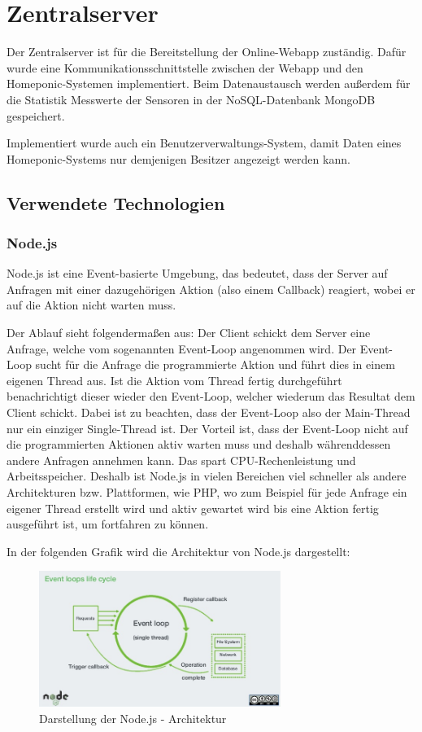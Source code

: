 \newpage
\blankpage
\section{Zentralserver}
\setcounter{page}{127}
Der Zentralserver ist für die Bereitstellung der Online-Webapp zuständig. Dafür wurde eine Kommunikationsschnittstelle zwischen der Webapp und den Homeponic-Systemen implementiert. Beim Datenaustausch werden außerdem für die Statistik Messwerte der Sensoren in der NoSQL-Datenbank MongoDB gespeichert. 

Implementiert wurde auch ein Benutzerverwaltungs-System, damit Daten eines Homeponic-Systems nur demjenigen Besitzer angezeigt werden kann.

\subsection{Verwendete Technologien}
\subsubsection{Node.js}
Node.js ist eine Event-basierte Umgebung, das bedeutet, dass der Server auf Anfragen mit einer dazugehörigen Aktion (also einem Callback) reagiert, wobei er auf die Aktion nicht warten muss.

Der Ablauf sieht folgendermaßen aus: Der Client schickt dem Server eine Anfrage, welche vom sogenannten Event-Loop  angenommen wird. Der Event-Loop sucht für die Anfrage die programmierte Aktion und führt dies in einem eigenen Thread aus. Ist die Aktion vom Thread fertig durchgeführt benachrichtigt dieser wieder den Event-Loop, welcher wiederum das Resultat dem Client schickt. Dabei ist zu beachten, dass der Event-Loop also der Main-Thread nur ein einziger Single-Thread ist. Der Vorteil ist, dass der Event-Loop nicht auf die programmierten Aktionen aktiv warten muss und deshalb währenddessen andere Anfragen annehmen kann. Das spart CPU-Rechenleistung und Arbeitsspeicher. Deshalb ist Node.js in vielen Bereichen viel schneller als andere Architekturen bzw. Plattformen, wie PHP, wo zum Beispiel für jede Anfrage ein eigener Thread erstellt wird und aktiv gewartet wird bis eine Aktion fertig ausgeführt ist, um fortfahren zu können.

In der folgenden Grafik wird die Architektur von Node.js dargestellt:

\begin{figure}[ht]
    \centering
	\includegraphics[width=0.7\textwidth]{images/nodejs}
	\caption{Darstellung der Node.js - Architektur \cite{node}}
\end{figure}

